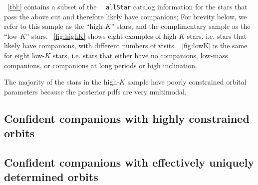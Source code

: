 \documentclass[modern, letterpaper]{aastex62}
\newcommand{\apogee}{\project{\acronym{APOGEE}}}
\newcommand{\DR}{\acronym{DR14}}
\begin{document}

\tablename~\ref{tbl:} contains a subset of the \apogee\ \DR\ \texttt{allStar}
catalog information for the stars that pass the above cut and therefore likely
have companions; For brevity below, we refer to this sample as the ``high-$K$''
stars, and the complimentary sample as the ``low-$K$'' stars.
\figurename~\ref{fig:highK} shows eight examples of high-$K$ stars, i.e. stars
that likely have companions, with different numbers of visits.
\figurename~\ref{fig:lowK} is the same for eight low-$K$ stars, i.e. stars that
either have no companions, low-mass companions, or companions at long periods or
high inclination.

The majority of the stars in the high-$K$ sample have poorly constrained orbital
parameters because the posterior pdfs are very multimodal.




\subsection{Confident companions with highly constrained orbits}
\label{sec:catalog-multimodal}



\subsection{Confident companions with effectively uniquely determined orbits}
\label{sec:catalog-unimodal}
\end{document}
